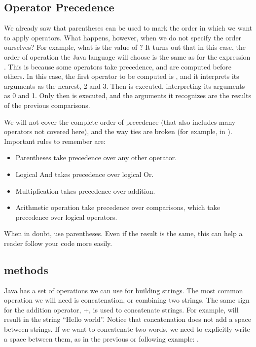 \subsection{Operator Precedence}

We already saw that parentheses can be used to mark the order in which we want to apply operators. What happens, however, when we do not specify the order ourselves? For example, what is the value of ? It turns out that in this case, the order of operation the Java language will choose is the same as for the expression . This is because some operators take precedence, and are computed before others. In this case, the first operator to be computed is \ic{>}, and it interprets its arguments as the nearest, 2 and 3. Then \ic{==} is executed, interpreting its arguments as 0 and 1. Only then \ic{||} is executed, and the arguments it recognizes are the results of the previous comparisons.

We will not cover the complete order of precedence (that also includes many operators not covered here), and the way ties are broken (for example, in ). Important rules to remember are:

\begin{itemize}
\item Parentheses take precedence over any other operator.
\item Logical And takes precedence over logical Or. 
\item Multiplication takes precedence over addition.
\item Arithmetic operation take precedence over comparisons, which take precedence over logical operators.
\end{itemize}

When in doubt, use parentheses. Even if the result is the same, this can help a reader follow your code more easily. 


\subsection{ methods}

Java has a set of operations we can use for building strings. The most common operation we will need is concatenation, or combining two strings. The same sign for the addition operator, +, is used to concatenate strings. For example,  will result in the string ``Hello world''. Notice that concatenation does not add a space between strings. If we want to concatenate two words, we need to explicitly write a space between them, as in the previous or following example: .

